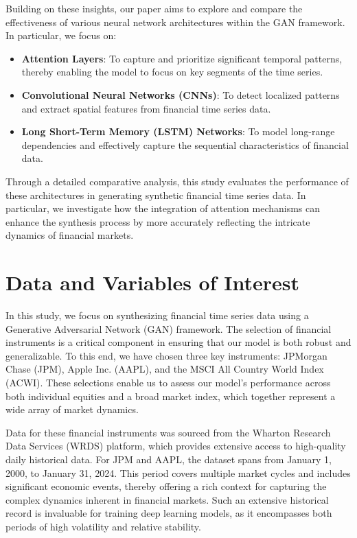 \documentclass{article}
\begin{document}
Building on these insights, our paper aims to explore and compare the effectiveness of various neural network architectures within the GAN framework. In particular, we focus on:
\begin{itemize}
    \item \textbf{Attention Layers}: To capture and prioritize significant temporal patterns, thereby enabling the model to focus on key segments of the time series.
    \item \textbf{Convolutional Neural Networks (CNNs)}: To detect localized patterns and extract spatial features from financial time series data.
    \item \textbf{Long Short-Term Memory (LSTM) Networks}: To model long-range dependencies and effectively capture the sequential characteristics of financial data.
\end{itemize}

Through a detailed comparative analysis, this study evaluates the performance of these architectures in generating synthetic financial time series data. In particular, we investigate how the integration of attention mechanisms can enhance the synthesis process by more accurately reflecting the intricate dynamics of financial markets.


\section{Data and Variables of Interest}

In this study, we focus on synthesizing financial time series data using a Generative Adversarial Network (GAN) framework. The selection of financial instruments is a critical component in ensuring that our model is both robust and generalizable. To this end, we have chosen three key instruments: JPMorgan Chase (JPM), Apple Inc. (AAPL), and the MSCI All Country World Index (ACWI). These selections enable us to assess our model's performance across both individual equities and a broad market index, which together represent a wide array of market dynamics.

Data for these financial instruments was sourced from the Wharton Research Data Services (WRDS) platform, which provides extensive access to high-quality daily historical data. For JPM and AAPL, the dataset spans from January 1, 2000, to January 31, 2024. This period covers multiple market cycles and includes significant economic events, thereby offering a rich context for capturing the complex dynamics inherent in financial markets. Such an extensive historical record is invaluable for training deep learning models, as it encompasses both periods of high volatility and relative stability.
\end{document}
